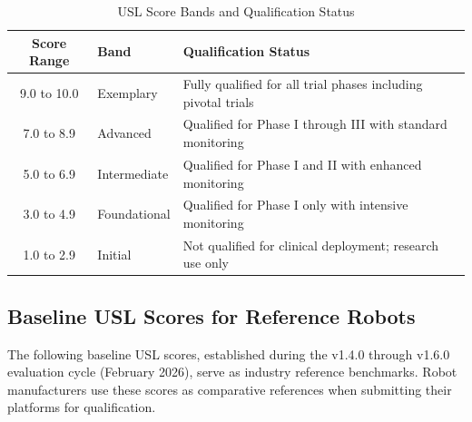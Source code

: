 \documentclass[11pt,letterpaper]{article}
\begin{document}
\begin{table}[H]
\centering
\caption{USL Score Bands and Qualification Status}
\small
\begin{tabularx}{\textwidth}{c l X}
\toprule
\textbf{Score Range} & \textbf{Band} & \textbf{Qualification Status} \\
\midrule
9.0 to 10.0 & Exemplary & Fully qualified for all trial phases including pivotal trials \\
7.0 to 8.9 & Advanced & Qualified for Phase I through III with standard monitoring \\
5.0 to 6.9 & Intermediate & Qualified for Phase I and II with enhanced monitoring \\
3.0 to 4.9 & Foundational & Qualified for Phase I only with intensive monitoring \\
1.0 to 2.9 & Initial & Not qualified for clinical deployment; research use only \\
\bottomrule
\end{tabularx}
\end{table}

\subsection{Baseline USL Scores for Reference Robots}

The following baseline USL scores, established during the v1.4.0 through v1.6.0 evaluation cycle (February 2026), serve as industry reference benchmarks. Robot manufacturers \SHOULD{} use these scores as comparative references when submitting their platforms for qualification.
\end{document}
